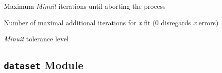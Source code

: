 \documentclass[a4paper,10pt,english]{sphinxmanual}
\begin{document}

\begin{fulllineitems}
\label{index:kafe.constants.M_MAX_ITERATIONS}
Maximum \emph{Minuit} iterations until aborting the process

\end{fulllineitems}


\begin{fulllineitems}
\label{index:kafe.constants.M_MAX_X_FIT_ITERATIONS}
Number of maximal additional iterations for \emph{x} fit (0 disregards \emph{x} errors)

\end{fulllineitems}


\begin{fulllineitems}
\label{index:kafe.constants.M_TOLERANCE}
\emph{Minuit} tolerance level

\end{fulllineitems}



\subsection{\texttt{dataset} Module}
\label{index:dataset-module}\label{index:module-kafe.dataset}\label{index:module-dataset}
\end{document}
